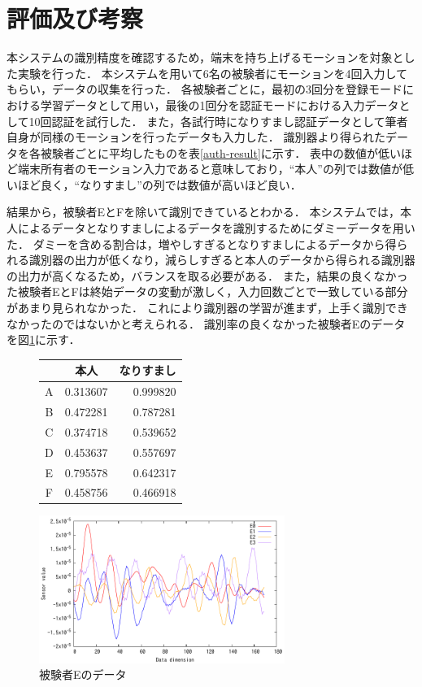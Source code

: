 \section{評価及び考察}
本システムの識別精度を確認するため，端末を持ち上げるモーションを対象とした実験を行った．
本システムを用いて6名の被験者にモーションを4回入力してもらい，データの収集を行った．
各被験者ごとに，最初の3回分を登録モードにおける学習データとして用い，最後の1回分を認証モードにおける入力データとして10回認証を試行した．
また，各試行時になりすまし認証データとして筆者自身が同様のモーションを行ったデータも入力した．
識別器より得られたデータを各被験者ごとに平均したものを表\ref{auth-result}に示す．
表中の数値が低いほど端末所有者のモーション入力であると意味しており，``本人''の列では数値が低いほど良く，``なりすまし''の列では数値が高いほど良い．

結果から，被験者EとFを除いて識別できているとわかる．
本システムでは，本人によるデータとなりすましによるデータを識別するためにダミーデータを用いた．
ダミーを含める割合は，増やしすぎるとなりすましによるデータから得られる識別器の出力が低くなり，減らしすぎると本人のデータから得られる識別器の出力が高くなるため，バランスを取る必要がある．
また，結果の良くなかった被験者EとFは終始データの変動が激しく，入力回数ごとで一致している部分があまり見られなかった．
これにより識別器の学習が進まず，上手く識別できなかったのではないかと考えられる．
識別率の良くなかった被験者Eのデータを図\ref{compare}に示す．

\begin{figure}[!tb]
  \def\@captype{table}
  \begin{minipage}{.48\textwidth}
    \centering
    \label{auth-result}
    \begin{tabular}{|c|r|r|} \hline
      \multicolumn{1}{|c|}{}  & \multicolumn{1}{c|}{本人} & \multicolumn{1}{c|}{なりすまし} \\ \hline \hline
      A & 0.313607 & 0.999820 \\ \hline
      B & 0.472281 & 0.787281 \\ \hline
      C & 0.374718 & 0.539652 \\ \hline
      D & 0.453637 & 0.557697 \\ \hline
      E & 0.795578 & 0.642317 \\ \hline
      F & 0.458756 & 0.466918 \\ \hline
    \end{tabular}
  \end{minipage}
  \hfill
  \begin{minipage}{.48\textwidth}
    \centering
    \includegraphics[bb=0 0 360 216, width=8cm]{Graphs/comp_E.pdf}
    \caption{被験者Eのデータ}
    \label{compare}
  \end{minipage}
\end{figure}
